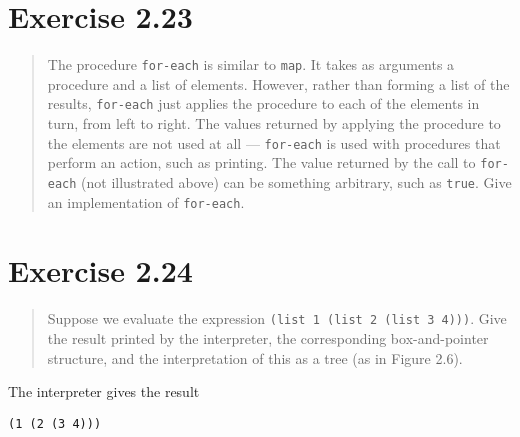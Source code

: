 \documentclass{article}
\begin{document}
\section{Exercise 2.23}
\begin{quote}
    The procedure \texttt{for-each} is similar to \texttt{map}. It takes as
    arguments a procedure and a list of elements. However, rather than forming
    a list of the results, \texttt{for-each} just applies the procedure to each
    of the elements in turn, from left to right. The values returned by
    applying the procedure to the elements are not used at all ---
    \texttt{for-each} is used with procedures that perform an action, such as
    printing. The value returned by the call to \texttt{for-each} (not
    illustrated above) can be something arbitrary, such as \texttt{true}. Give
    an implementation of \texttt{for-each}.
\end{quote}



\section{Exercise 2.24}
\begin{quote}
    Suppose we evaluate the expression \texttt{(list 1 (list 2 (list 3 4)))}.
    Give the result printed by the interpreter, the corresponding
    box-and-pointer structure, and the interpretation of this as a tree (as in
    Figure 2.6).
\end{quote}

The interpreter gives the result
\begin{lstlisting}
(1 (2 (3 4)))
\end{lstlisting}

\end{document}

